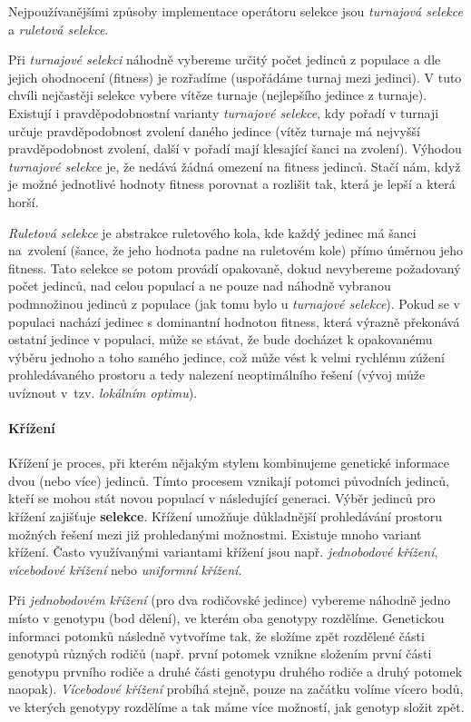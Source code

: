Nejpoužívanějšími způsoby implementace operátoru selekce jsou \emph{turnajová
selekce} a \emph{ruletová selekce}. 

Při \emph{turnajové selekci} náhodně vybereme určitý počet jedinců z
populace a dle jejich ohodnocení (fitness) je rozřadíme (uspořádáme turnaj mezi
jedinci). V tuto chvíli nejčastěji selekce vybere vítěze turnaje (nejlepšího
jedince z turnaje). Existují i pravděpodobnostní varianty \emph{turnajové
selekce}, kdy pořadí v turnaji určuje pravděpodobnost zvolení daného jedince
(vítěz turnaje má nejvyšší pravděpodobnost zvolení, další v pořadí mají
klesající šanci na zvolení). Výhodou \emph{turnajové selekce} je, že nedává
žádná omezení na fitness jedinců. Stačí nám, když je možné jednotlivé hodnoty
fitness porovnat a rozlišit tak, která je lepší a která horší.

\emph{Ruletová selekce} je abstrakce ruletového kola, kde každý jedinec má šanci
na~zvolení (šance, že jeho hodnota padne na ruletovém kole) přímo úměrnou jeho
fitness. Tato selekce se potom provádí opakovaně, dokud nevybereme požadovaný
počet jedinců, nad celou populací a ne pouze nad náhodně vybranou podmnožinou
jedinců z populace (jak tomu bylo u \emph{turnajové selekce}). Pokud se v
populaci nachází jedinec s dominantní hodnotou fitness, která výrazně překonává
ostatní jedince v populaci, může se stávat, že bude docházet k opakovanému
výběru jednoho a toho samého jedince, což může vést k velmi rychlému zúžení
prohledávaného prostoru a tedy nalezení neoptimálního řešení (vývoj může
uvíznout v~tzv. \emph{lokálním optimu}).

\paragraph{Křížení}
Křížení je proces, při kterém nějakým stylem kombinujeme genetické informace
dvou (nebo více) jedinců. Tímto procesem vznikají potomci původních jedinců,
kteří se mohou stát novou populací v následující generaci. Výběr jedinců pro
křížení zajišťuje \textbf{selekce}. Křížení umožňuje důkladnější prohledávání
prostoru možných řešení mezi již prohledanými možnostmi. Existuje mnoho variant
křížení. Často využívanými variantami křížení jsou např. \emph{jednobodové
křížení}, \emph{vícebodové křížení} nebo \emph{uniformní křížení}.

Při \emph{jednobodovém křížení} (pro dva rodičovské jedince) vybereme náhodně
jedno místo v genotypu (bod dělení), ve kterém oba genotypy rozdělíme.
Genetickou informaci potomků následně vytvoříme tak, že složíme zpět rozdělené
části genotypů různých rodičů (např. první potomek vznikne složením první části
genotypu prvního rodiče a druhé části genotypu druhého rodiče a druhý potomek
naopak). \emph{Vícebodové křížení} probíhá stejně, pouze na začátku volíme
vícero bodů, ve kterých genotypy rozdělíme a tak máme více možností, jak
genotyp složit zpět.


